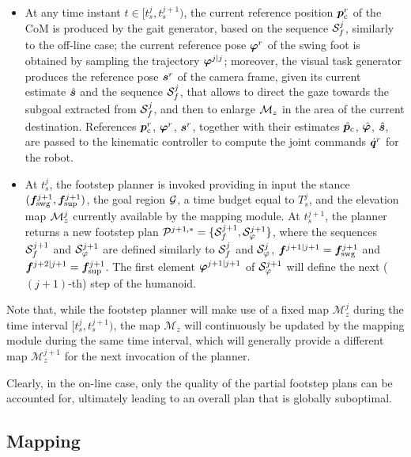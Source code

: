\begin{itemize}
    \item At any time instant $t \in [t_s^j, t_s^{j+1})$, the current reference position ${\bm{p}}_{\rm c}^r$ of the CoM is produced by the gait generator, based on the sequence ${\cal S}_f^j$, similarly to the off-line case; the current reference pose ${\bm{\varphi}}^r$ of the swing foot is obtained by sampling the trajectory ${\bm{\varphi}}^{j|j}$; moreover, the visual task generator produces the reference pose ${\bm{s}}^r$ of the camera frame, given its current estimate $\hat{{\bm{s}}}$ and the sequence ${\cal S}_f^j$, that allows to direct the gaze towards the subgoal extracted from ${\cal S}_f^j$, and then to enlarge ${\cal M}_z$ in the area of the current destination. 
    References ${\bm{p}}_{\rm c}^r$, ${\bm{\varphi}}^r$, ${\bm{s}}^r$, together with their estimates $\hat{{\bm{p}}}_{\rm c}$, $\hat{{\bm{\varphi}}}$, $\hat{{\bm{s}}}$, are passed to the kinematic controller to compute the joint commands $\dot{{\bm{q}}}^r$ for the robot.
    \item At $t_s^j$, the footstep planner is invoked providing in input the stance $({\bm{f}}_{\rm swg}^{j+1}, {\bm{f}}_{\rm sup}^{j+1})$, the goal region $\cal G$, a time budget equal to $T_s^j$, and the elevation map ${\cal M}_z^j$ currently available by the mapping module.
    At $t_s^{j+1}$, the planner returns a new footstep plan ${\cal P}^{j+1,*} = \{ {\cal S}_f^{j+1}, {\cal S}_\varphi^{j+1}\}$, where the sequences ${\cal S}_f^{j+1}$ and ${\cal S}_\varphi^{j+1}$ are defined similarly to ${\cal S}_f^{j}$ and ${\cal S}_\varphi^{j}$, ${\bm{f}}^{j+1|j+1} = {\bm{f}}_{\rm swg}^{j+1}$ and ${\bm{f}}^{j+2|j+1} = {\bm{f}}_{\rm sup}^{j+1}$. 
    The first element ${\bm{\varphi}}^{j+1|j+1}$ of ${\cal S}_\varphi^{j+1}$ will define the next ($(j+1)$-th) step of the humanoid. 
\end{itemize}

Note that, while the footstep planner will make use of a fixed map $\mathcal{M}_z^j$ during the time interval $[t_s^j, t_s^{j+1})$, the map $\mathcal{M}_z$ will continuously be updated by the mapping module during the same time interval, which will generally provide a different map $\mathcal{M}_z^{j+1}$ for the next invocation of the planner.

Clearly, in the on-line case, only the quality of the partial footstep plans can be accounted for, ultimately leading to an overall plan that is globally suboptimal. 



\subsection{Mapping}
\label{sec:onlineCase:MappingModule}


